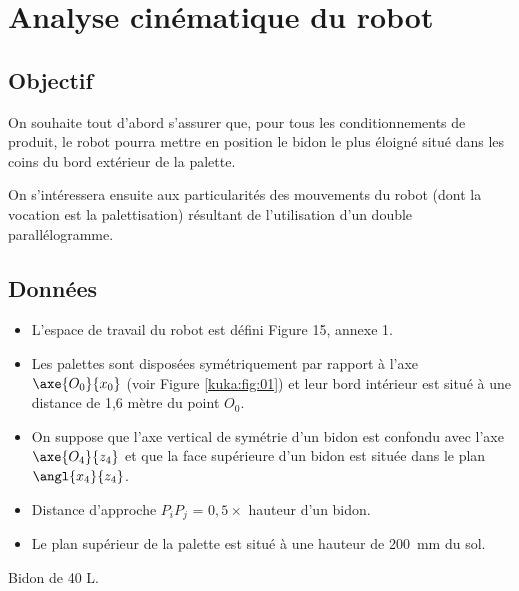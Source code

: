 \section{Analyse cinématique du robot}

\subsection{Objectif}
\ifprof\else
On souhaite tout d’abord s’assurer que, pour tous les conditionnements de produit, le robot 
pourra mettre en position le bidon le plus éloigné situé dans les coins du bord extérieur de la 
palette. 

On s’intéressera ensuite aux particularités des mouvements du robot (dont la vocation est la 
palettisation) résultant de l’utilisation d’un double parallélogramme. 
\fi

\subsection{Données} 
\ifprof\else
\begin{itemize}
\item L’espace de travail du robot est défini Figure 15, annexe 1. 
\item Les palettes sont disposées symétriquement par rapport à l’axe $\axe{O_0}{x_0}$ (voir Figure \ref{kuka:fig:01}) et leur bord intérieur est situé à une distance de 1,6 mètre du point $O_0$. 
\item On suppose que l’axe vertical de symétrie d’un bidon est confondu avec l’axe $\axe{O_4}{z_4}$
et que la face supérieure d’un bidon est située dans le plan $\angl{x_4}{z_4}$. 
\item Distance d’approche $P_iP_j$ = $0,5 \times$ hauteur d’un bidon.%
\item Le plan supérieur de la palette est situé à une hauteur de \SI{200}{mm} du sol. 
\end{itemize}
\fi

\ifprof
\begin{corrige}
Bidon de 40 L.
\end{corrige}
\else
\fi





